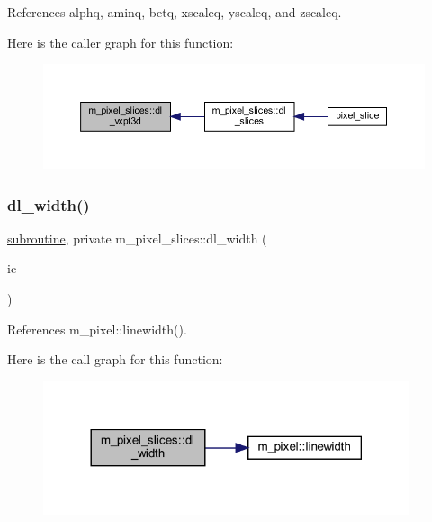 References alphq, aminq, betq, xscaleq, yscaleq, and zscaleq.

Here is the caller graph for this function\+:
\nopagebreak
\begin{figure}[H]
\begin{center}
\leavevmode
\includegraphics[width=350pt]{namespacem__pixel__slices_a61f419d67b700758eceed72e406a37f0_icgraph}
\end{center}
\end{figure}
\mbox{\label{namespacem__pixel__slices_a2a4bb6da0ae36c65fdf05996e3ae5487}} 
\subsubsection{\texorpdfstring{dl\+\_\+width()}{dl\_width()}}
{\footnotesize\ttfamily \hyperlink{M__stopwatch_83_8txt_acfbcff50169d691ff02d4a123ed70482}{subroutine}, private m\+\_\+pixel\+\_\+slices\+::dl\+\_\+width (\begin{DoxyParamCaption}\item[{}]{ic }\end{DoxyParamCaption})\hspace{0.3cm}{\ttfamily [private]}}



References m\+\_\+pixel\+::linewidth().

Here is the call graph for this function\+:
\nopagebreak
\begin{figure}[H]
\begin{center}
\leavevmode
\includegraphics[width=305pt]{namespacem__pixel__slices_a2a4bb6da0ae36c65fdf05996e3ae5487_cgraph}
\end{center}
\end{figure}


